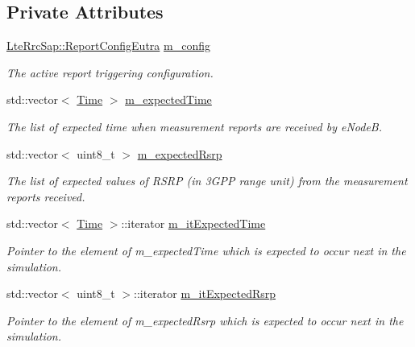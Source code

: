 \subsection*{Private Attributes}
\begin{DoxyCompactItemize}
\item 
\hyperlink{structns3_1_1LteRrcSap_1_1ReportConfigEutra}{Lte\+Rrc\+Sap\+::\+Report\+Config\+Eutra} \hyperlink{classLteUeMeasurementsPiecewiseTestCase2_a90660b3f94d62547d30ea5d3eabebc80}{m\+\_\+config}
\begin{DoxyCompactList}\small\item\em The active report triggering configuration. \end{DoxyCompactList}\item 
std\+::vector$<$ \hyperlink{classns3_1_1Time}{Time} $>$ \hyperlink{classLteUeMeasurementsPiecewiseTestCase2_affb68ca4f88019ca3b9aadbefe29d908}{m\+\_\+expected\+Time}
\begin{DoxyCompactList}\small\item\em The list of expected time when measurement reports are received by e\+NodeB. \end{DoxyCompactList}\item 
std\+::vector$<$ uint8\+\_\+t $>$ \hyperlink{classLteUeMeasurementsPiecewiseTestCase2_a657edc6c75b0ebc54cebca3ba7bb166f}{m\+\_\+expected\+Rsrp}
\begin{DoxyCompactList}\small\item\em The list of expected values of R\+S\+RP (in 3\+G\+PP range unit) from the measurement reports received. \end{DoxyCompactList}\item 
std\+::vector$<$ \hyperlink{classns3_1_1Time}{Time} $>$\+::iterator \hyperlink{classLteUeMeasurementsPiecewiseTestCase2_a49b9123d994ebabacb649491774d231d}{m\+\_\+it\+Expected\+Time}
\begin{DoxyCompactList}\small\item\em Pointer to the element of {\ttfamily m\+\_\+expected\+Time} which is expected to occur next in the simulation. \end{DoxyCompactList}\item 
std\+::vector$<$ uint8\+\_\+t $>$\+::iterator \hyperlink{classLteUeMeasurementsPiecewiseTestCase2_adf38952334ae0b1372acdc5004420a01}{m\+\_\+it\+Expected\+Rsrp}
\begin{DoxyCompactList}\small\item\em Pointer to the element of {\ttfamily m\+\_\+expected\+Rsrp} which is expected to occur next in the simulation. \end{DoxyCompactList}\item 

\end{DoxyCompactItemize}
